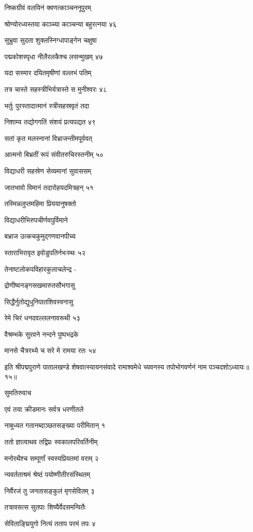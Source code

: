 निष्कग्रीवं वलयिनं क्वणत्काञ्चननूपुरम्

श्रोण्योरध्यस्तया काञ्च्या काञ्चन्या बहुरत्नया ४६

सुभ्रुवा सुदता शुक्लस्निग्धापाङ्गेन चक्षुषा

पद्मकोशस्पृधा नीलैरलकैश्च लसन्मुखम् ४७

यदा सस्मार दयितमृषीणां वल्लभं पतिम्

तत्र चास्ते सहस्त्रीभिर्यत्रास्ते स मुनीश्वरः ४८

भर्तुः पुरस्तादात्मानं स्त्रीसहस्रवृतं तदा

निशाम्य तद्योगगतिं संशयं प्रत्यपद्यत ४९

सतां कृत मलस्नानां विभ्राजन्तीमपूर्ववत्

आत्मनो बिभ्रतीं रूपं संवीतरुचिरस्तनीम् ५०

विद्याधरी सहस्रेण सेव्यमानां सुवाससम्

जातभावो विमानं तदारोहयदमित्रहन् ५१

तस्मिन्नलुप्तमहिमा प्रिययानुषक्तो

विद्याधरीभिरुपचीर्णवपुर्विमाने

बभ्राज उत्कचकुमुद्गणवानपीच्य

स्ताराभिरावृत इवोडुपतिर्नभःस्थः ५२

तेनाष्टलोकपविहारकुलाचलेन्द्र -

द्रोणीष्वनङ्गसखमारुतसौभगासु

सिद्धैर्नुतोद्युधुनिपातशिवस्वनासु

रेमे चिरं धनदवल्ललनावरूथी ५३

वैश्रम्भके सुरवने नन्दने पुष्पभद्रके

मानसे चैत्ररथ्ये च सरे मे रामया रतः ५४

इति श्रीपद्मपुराणे पातालखण्डे शेषवात्स्यायनसंवादे रामाश्वमेधे च्यवनस्य तपोभोगवर्णनं नाम पञ्चदशोऽध्यायः॥१५॥


सुमतिरुवाच

एवं तया क्रीडमानः सर्वत्र धरणीतले

नाबुध्यत गतानब्दाञ्छतसङ्ख्या परीमितान् १

ततो ज्ञात्वाथव तद्विप्रः स्वकालपरिवर्तिनीम्

मनोरथैश्च सम्पूर्णां स्वस्यप्रियतमां वराम् २

न्यवर्तताश्रमं श्रेष्ठं पयोष्णीतीरसंस्थितम्

निर्वैरजं तु जनतासङ्कुलं मृगसेवितम् ३

तत्रावसत्स सुतपाः शिष्यैर्वेदसमन्वितैः

सेविताङ्घ्रियुगो नित्यं तताप परमं तपः ४


